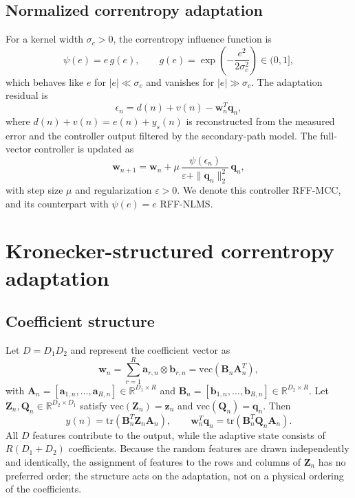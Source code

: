 \documentclass[preprint,12pt]{elsarticle}
\begin{document}
\subsection{Normalized correntropy adaptation}
For a kernel width $\sigma_c > 0$, the correntropy influence function is
\begin{equation}
\psi(e) = e\, g(e), \qquad g(e) = \exp\!\left(-\frac{e^2}{2\sigma_c^2}\right) \in (0, 1], \tag{6}
\end{equation}
which behaves like $e$ for $|e| \ll \sigma_c$ and vanishes for $|e| \gg \sigma_c$. The adaptation residual is
\begin{equation}
\epsilon_n = d(n) + v(n) - \mathbf{w}_n^T \mathbf{q}_n, \tag{7}
\end{equation}
where $d(n) + v(n) = e(n) + y_s(n)$ is reconstructed from the measured error and the controller output filtered by the secondary-path model. The full-vector controller is updated as
\begin{equation}
\mathbf{w}_{n+1} = \mathbf{w}_n + \mu\, \frac{\psi(\epsilon_n)}{\varepsilon + \|\mathbf{q}_n\|_2^2}\, \mathbf{q}_n, \tag{8}
\end{equation}
with step size $\mu$ and regularization $\varepsilon > 0$. We denote this controller RFF-MCC, and its counterpart with $\psi(e) = e$ RFF-NLMS.
\section{Kronecker-structured correntropy adaptation}
\subsection{Coefficient structure}
Let $D = D_1 D_2$ and represent the coefficient vector as
\begin{equation}
\mathbf{w}_n = \sum_{r=1}^{R} \mathbf{a}_{r,n} \otimes \mathbf{b}_{r,n} = \mathrm{vec}(\mathbf{B}_n \mathbf{A}_n^T), \tag{9}
\end{equation}
with $\mathbf{A}_n = [\mathbf{a}_{1,n}, \ldots, \mathbf{a}_{R,n}] \in \mathbb{R}^{D_1 \times R}$ and $\mathbf{B}_n = [\mathbf{b}_{1,n}, \ldots, \mathbf{b}_{R,n}] \in \mathbb{R}^{D_2 \times R}$. Let $\mathbf{Z}_n, \mathbf{Q}_n \in \mathbb{R}^{D_2 \times D_1}$ satisfy $\mathrm{vec}(\mathbf{Z}_n) = \mathbf{z}_n$ and $\mathrm{vec}(\mathbf{Q}_n) = \mathbf{q}_n$. Then
\begin{equation}
y(n) = \mathrm{tr}(\mathbf{B}_n^T \mathbf{Z}_n \mathbf{A}_n), \qquad \mathbf{w}_n^T \mathbf{q}_n = \mathrm{tr}(\mathbf{B}_n^T \mathbf{Q}_n \mathbf{A}_n). \tag{10}
\end{equation}
All $D$ features contribute to the output, while the adaptive state consists of $R(D_1 + D_2)$ coefficients. Because the random features are drawn independently and identically, the assignment of features to the rows and columns of $\mathbf{Z}_n$ has no preferred order; the structure acts on the adaptation, not on a physical ordering of the coefficients.
\end{document}
